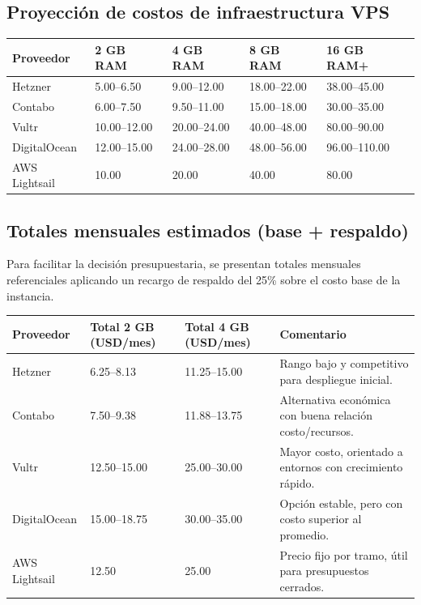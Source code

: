 \subsection{Proyección de costos de infraestructura VPS}
\begin{longtable}{p{} p{} p{} p{} p{}}
\toprule
\textbf{Proveedor} & \textbf{2 GB RAM} & \textbf{4 GB RAM} & \textbf{8 GB RAM} & \textbf{16 GB RAM+} \\
\midrule
Hetzner & 5.00--6.50 & 9.00--12.00 & 18.00--22.00 & 38.00--45.00 \\
Contabo & 6.00--7.50 & 9.50--11.00 & 15.00--18.00 & 30.00--35.00 \\
Vultr & 10.00--12.00 & 20.00--24.00 & 40.00--48.00 & 80.00--90.00 \\
DigitalOcean & 12.00--15.00 & 24.00--28.00 & 48.00--56.00 & 96.00--110.00 \\
AWS Lightsail & 10.00 & 20.00 & 40.00 & 80.00 \\
\bottomrule
\end{longtable}

\subsection{Totales mensuales estimados (base + respaldo)}
Para facilitar la decisión presupuestaria, se presentan totales mensuales referenciales aplicando un recargo de respaldo del 25\% sobre el costo base de la instancia.

\begin{longtable}{p{} p{} p{} p{}}
\toprule
\textbf{Proveedor} & \textbf{Total 2 GB (USD/mes)} & \textbf{Total 4 GB (USD/mes)} & \textbf{Comentario} \\
\midrule
Hetzner & 6.25--8.13 & 11.25--15.00 & Rango bajo y competitivo para despliegue inicial. \\
Contabo & 7.50--9.38 & 11.88--13.75 & Alternativa económica con buena relación costo/recursos. \\
Vultr & 12.50--15.00 & 25.00--30.00 & Mayor costo, orientado a entornos con crecimiento rápido. \\
DigitalOcean & 15.00--18.75 & 30.00--35.00 & Opción estable, pero con costo superior al promedio. \\
AWS Lightsail & 12.50 & 25.00 & Precio fijo por tramo, útil para presupuestos cerrados. \\
\bottomrule
\end{longtable}

